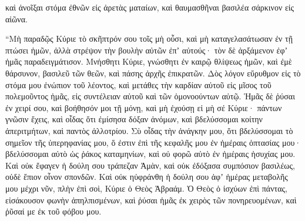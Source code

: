 {καὶ ἀνοῖξαι στόμα ἐθνῶν εἰς ἀρετὰς ματαίων, καὶ θαυμασθῆναι βασιλέα σάρκινον εἰς αἰῶνα.
\par }{\PP {}“Μὴ παραδῷς Κύριε τὸ σκῆπτρόν σου τοῖς μὴ οὖσι, καὶ μὴ καταγελασάτωσαν ἐν τῇ πτώσει ἡμῶν, ἀλλὰ στρέψον τὴν βουλὴν αὐτῶν ἐπʼ αὐτούς· τὸν δὲ ἀρξάμενον ἐφʼ ἡμᾶς παραδειγμάτισον.
Μνήσθητι Κύριε, γνώσθητι ἐν καιρῷ θλίψεως ἡμῶν, καὶ ἐμὲ θάρσυνον, βασιλεῦ τῶν θεῶν, καὶ πάσης ἀρχῆς ἐπικρατῶν.
Δὸς λόγον εὔρυθμον εἰς τὸ στόμα μου ἐνώπιον τοῦ λέοντος, καὶ μετάθες τὴν καρδίαν αὐτοῦ εἰς μῖσος τοῦ πολεμοῦντος ἡμᾶς, εἰς συντέλειαν αὐτοῦ καὶ τῶν ὁμονοούντων αὐτῷ.
Ἡμᾶς δὲ ῥύσαι ἐν χειρί σου, καὶ βοήθησόν μοι τῇ μόνῃ, καὶ μὴ ἐχούσῃ εἰ μὴ σέ Κύριε·
πάντων γνῶσιν ἔχεις, καὶ οἶδας ὅτι ἐμίσησα δόξαν ἀνόμων, καὶ βδελύσσομαι κοίτην ἀπεριτμήτων, καὶ παντὸς ἀλλοτρίου.
Σὺ οἶδας τὴν ἀνάγκην μου, ὅτι βδελύσσομαι τὸ σημεῖον τῆς ὑπερηφανίας μου, ὅ ἐστιν ἐπὶ τῆς κεφαλῆς μου ἐν ἡμέραις ὁπτασίας μου· βδελύσσομαι αὐτὸ ὡς ῥάκος καταμηνίων, καὶ οὐ φορῶ αὐτὸ ἐν ἡμέραις ἡσυχίας μου.
Καὶ οὐκ ἔφαγεν ἡ δούλη σου τράπεζαν Ἀμὰν, καὶ οὐκ ἐδόξασα συμπόσιον βασιλέως, οὐδὲ ἔπιον οἶνον σπονδῶν.
Καὶ οὐκ ηὐφράνθη ἡ δούλη σου ἀφʼ ἡμέρας μεταβολῆς μου μέχρι νῦν, πλὴν ἐπὶ σοὶ, Κύριε ὁ Θεὸς Ἁβραάμ.
Ὁ Θεὸς ὁ ἰσχύων ἐπὶ πάντας, εἰσάκουσον φωνὴν ἀπηλπισμένων, καὶ ῥύσαι ἡμᾶς ἐκ χειρὸς τῶν πονηρευομένων, καὶ ῥῦσαί με ἐκ τοῦ φόβου μου.

}
